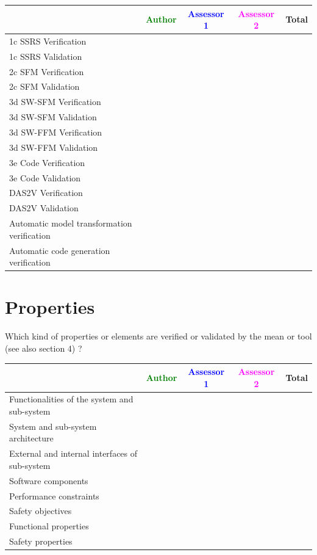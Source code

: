 \begin{tabular}{|l | c | c | c | c|}
\hline
& \textcolor{green}{Author} & \textcolor{blue}{Assessor 1} & \textcolor{magenta}{Assessor 2} & Total \\
\hline 
1c SSRS Verification & & & &  \\
\hline
1c SSRS Validation & & & &  \\
\hline
2c SFM Verification & & & &  \\
\hline
2c SFM Validation & & & &  \\
\hline
3d SW-SFM Verification & & & &  \\
\hline
3d SW-SFM Validation & & & &  \\
\hline
3d SW-FFM Verification & & & &  \\
\hline
3d SW-FFM Validation & & & &  \\
\hline
3e Code Verification & & & &  \\
\hline
3e Code Validation & & & &  \\
\hline
DAS2V Verification & & & &  \\
\hline
DAS2V Validation & & & &  \\
\hline
Automatic model transformation verification & & & &  \\
\hline
Automatic code generation verification & & & &  \\
\hline
\end{tabular}


\section{Properties}

Which kind of properties or elements are verified or validated by the mean or tool (see also \citep{D4.1} section 4)  ?



\begin{tabular}{|l | c | c | c | c|}
\hline
& \textcolor{green}{Author} & \textcolor{blue}{Assessor 1} & \textcolor{magenta}{Assessor 2} & Total \\
\hline 
Functionalities of the system and sub-system & & & &  \\
\hline
System and sub-system architecture & & & &  \\
\hline
External and internal interfaces of sub-system & & & &  \\
\hline
Software components & & & &  \\
\hline
Performance constraints & & & &  \\
\hline
Safety objectives & & & &  \\
\hline
Functional properties & & & &  \\
\hline
Safety properties & & & &  \\
\hline
\end{tabular}



